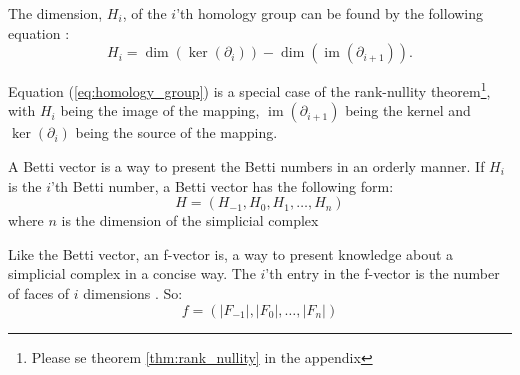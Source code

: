\documentclass[11pt,a4paper,twoside]{report}
\DeclareMathOperator{\im}{im}
\begin{document}
The dimension, $H_i$, of the $i$'th homology group can be found by the following equation \cite[p.2]{Allgaier}:
\begin{equation}\label{eq:homology_group}
H_i = \dim(\ker(\partial_i))-\dim(\im(\partial_{i+1})).
\end{equation}

Equation (\ref{eq:homology_group}) is a special case of the rank-nullity theorem\footnote{Please se theorem \ref{thm:rank_nullity} in the appendix}, with $H_i$ being the image of the mapping, $\im(\partial_{i+1})$ being the kernel and $\ker(\partial_i)$ being the source of the mapping.

A Betti vector is a way to present the Betti numbers in an orderly manner. If $H_i$ is the $i$'th Betti number, a Betti vector has the following form:
\begin{equation*}
H = (H_{-1},H_0,H_1,\dots,H_n)
\end{equation*}
where $n$ is the dimension of the simplicial complex

Like the Betti vector, an f-vector is, a way to present knowledge about a simplicial complex in a concise way. The $i$'th entry in the f-vector is the number of faces of $i$ dimensions \cite[p.15]{Jonsson}. So:
\begin{equation*}
f = (|F_{-1}|,|F_0|,\dots,|F_n|)
\end{equation*}
\end{document}
